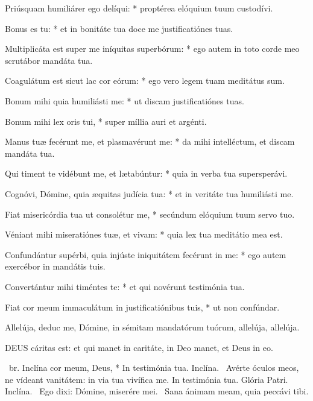 Priúsquam humiliárer ego delíqui: * proptérea elóquium tuum custodívi.

Bonus es tu: * et in bonitáte tua doce me justificatiónes tuas.

Multiplicáta est super me iníquitas superbórum: * ego autem in toto corde meo scrutábor mandáta tua.

Coagulátum est sicut lac cor eórum: * ego vero legem tuam meditátus sum.

Bonum mihi quia humiliásti me: * ut discam justificatiónes tuas.

Bonum mihi lex oris tui, * super míllia auri et argénti.

Manus tuæ fecérunt me, et plasmavérunt me: * da mihi intelléctum, et discam mandáta tua.

Qui timent te vidébunt me, et lætabúntur: * quia in verba tua supersperávi.

Cognóvi, Dómine, quia æquitas judícia tua: * et in veritáte tua humiliásti me.

Fiat misericórdia tua ut consolétur me, * secúndum elóquium tuum servo tuo.

Véniant mihi miseratiónes tuæ, et vivam: * quia lex tua meditátio mea est.

Confundántur supérbi, quia injúste iniquitátem fecérunt in me: * ego autem exercébor in mandátis tuis.

Convertántur mihi timéntes te: * et qui novérunt testimónia tua.

Fiat cor meum immaculátum in justificatiónibus tuis, * ut non confúndar.


 Allelúja, deduc me, Dómine, in sémitam mandatórum tuórum, allelúja, allelúja.


\lettrine[lines=2]{D}{EUS} cáritas est: et qui manet in caritáte, in Deo manet, et Deus in eo.

\R\ br. Inclína cor meum, Deus, * In testimónia tua. Inclína. \V\ Avérte óculos meos, ne vídeant vanitátem: in via tua vivífica me. In testimónia tua. Glória Patri. Inclína. \V\ Ego dixi: Dómine, miserére mei. \R\ Sana ánimam meam, quia peccávi tibi.



\sectionornament


